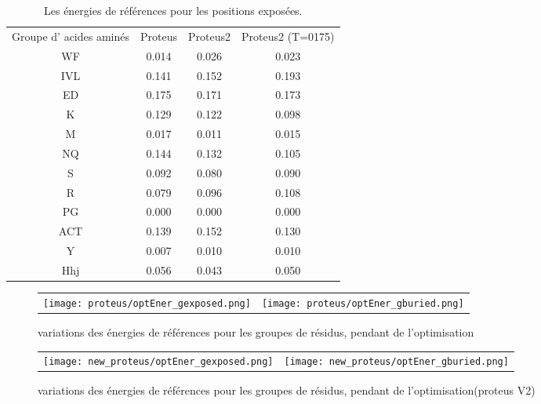     \begin{table}[!htbp]
      \centering

      \begin{tabular}{cccc}

        \toprule
        Groupe d' acides aminés & Proteus & Proteus2 & Proteus2 (T=0175)\\
        \cmidrule{1-4}


        WF  & 0.014  & 0.026   &  0.023 \\
        IVL & 0.141  & 0.152   &  0.193 \\
        ED  & 0.175  & 0.171   &  0.173 \\
        K   & 0.129  & 0.122   &  0.098 \\
        M   & 0.017  & 0.011   &  0.015 \\
        NQ  & 0.144  & 0.132   &  0.105 \\
        S   & 0.092  & 0.080   &  0.090 \\
        R   & 0.079  & 0.096   &  0.108 \\
        PG  & 0.000  & 0.000   &  0.000 \\
        ACT & 0.139  & 0.152   &  0.130 \\
        Y   & 0.007  & 0.010   &  0.010 \\
        Hhj & 0.056  & 0.043   &  0.050 \\


        \bottomrule


      \end{tabular}      
      \caption{Les énergies de références pour les positions exposées.}
\label{tab:RefEner_groupes}      
    \end{table}


    \clearpage


   \begin{figure}[t]
     \centering
     \begin{tabular}{cc}
       \texttt{[image: proteus/optEner\_gexposed.png]} &
       \texttt{[image: proteus/optEner\_gburied.png]} \\
     \end{tabular}
     \caption{variations des énergies de références pour les groupes de résidus, pendant de l'optimisation}
\label{graph:convEref}
   \end{figure}


   \begin{figure}[t]
     \centering
     \begin{tabular}{cc}
       \texttt{[image: new\_proteus/optEner\_gexposed.png]} &
       \texttt{[image: new\_proteus/optEner\_gburied.png]} \\

     \end{tabular}
     \caption{variations des énergies de références pour les groupes de résidus, pendant de l'optimisation(proteus V2)}
\label{graph:convEref2}
   \end{figure}



